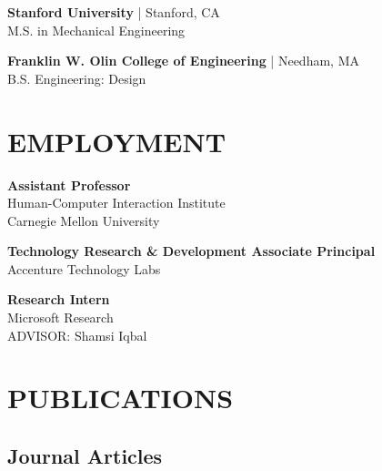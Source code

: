 \documentclass[11pt]{article} %
\begin{document}
\textbf{Stanford University} | Stanford, CA\\
M.S. in Mechanical Engineering\\
\medskip

\textbf{Franklin W. Olin College of Engineering} | Needham, MA\\
B.S. Engineering: Design\\


\section*{EMPLOYMENT}

\textbf{Assistant Professor}\\
Human-Computer Interaction Institute\\ 
Carnegie Mellon University\\
\medskip

\textbf{Technology Research \& Development Associate Principal}\\
Accenture Technology Labs\\
\medskip

\textbf{Research Intern}\\
Microsoft Research\\
ADVISOR: Shamsi Iqbal
\medskip









\section*{PUBLICATIONS}
\setlength\bibitemsep{12pt}
\subsection*{Journal Articles}
\begin{refsection}
\nocite{*}
\printbibliography[heading=none]
\end{refsection}
\end{document}
